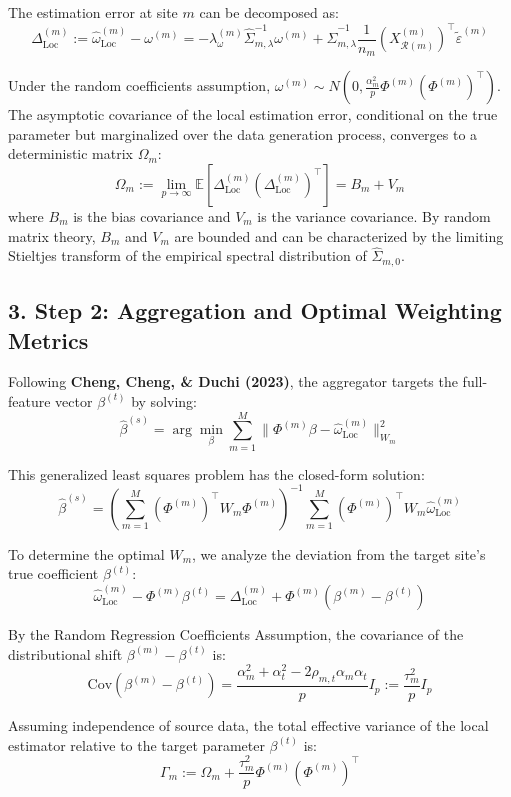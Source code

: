 \documentclass{article}
\begin{document}
The estimation error at site $m$ can be decomposed as:
\[
\Delta^{(m)}_{\mathrm{Loc}} := \widehat\omega^{(m)}_{\mathrm{Loc}} - \omega^{(m)} = - \lambda_\omega^{(m)} \hat{\Sigma}_{m,\lambda}^{-1} \omega^{(m)} + \hat{\Sigma}_{m,\lambda}^{-1} \frac{1}{n_m} (X^{(m)}_{\mathcal{R}(m)})^\top \tilde{\varepsilon}^{(m)}
\]

Under the random coefficients assumption, $\omega^{(m)} \sim N\left(0, \frac{\alpha_m^2}{p} \Phi^{(m)} (\Phi^{(m)})^\top\right)$. The asymptotic covariance of the local estimation error, conditional on the true parameter but marginalized over the data generation process, converges to a deterministic matrix $\Omega_m$:
\[
\Omega_m := \lim_{p \to \infty} \mathbb{E}\left[ \Delta^{(m)}_{\mathrm{Loc}} (\Delta^{(m)}_{\mathrm{Loc}})^\top \right] = B_m + V_m
\]
where $B_m$ is the bias covariance and $V_m$ is the variance covariance. By random matrix theory, $B_m$ and $V_m$ are bounded and can be characterized by the limiting Stieltjes transform of the empirical spectral distribution of $\hat{\Sigma}_{m,0}$.

\subsection*{3. Step 2: Aggregation and Optimal Weighting Metrics}

Following \textbf{Cheng, Cheng, \& Duchi (2023)}, the aggregator targets the full-feature vector $\beta^{(t)}$ by solving:
\[
\hat\beta^{(s)} = \arg\min_{\beta} \sum_{m=1}^M \bigl\| \Phi^{(m)}\beta - \widehat\omega^{(m)}_{\mathrm{Loc}} \bigr\|_{W_m}^2
\]

This generalized least squares problem has the closed-form solution:
\[
\hat\beta^{(s)} = \left( \sum_{m=1}^M (\Phi^{(m)})^\top W_m \Phi^{(m)} \right)^{-1} \sum_{m=1}^M (\Phi^{(m)})^\top W_m \widehat\omega^{(m)}_{\mathrm{Loc}}
\]

To determine the optimal $W_m$, we analyze the deviation from the target site's true coefficient $\beta^{(t)}$:
\[
\widehat\omega^{(m)}_{\mathrm{Loc}} - \Phi^{(m)}\beta^{(t)} = \Delta^{(m)}_{\mathrm{Loc}} + \Phi^{(m)}(\beta^{(m)} - \beta^{(t)})
\]

By the Random Regression Coefficients Assumption, the covariance of the distributional shift $\beta^{(m)} - \beta^{(t)}$ is:
\[
\mathrm{Cov}(\beta^{(m)} - \beta^{(t)}) = \frac{\alpha_m^2 + \alpha_t^2 - 2\rho_{m,t}\alpha_m\alpha_t}{p} I_p := \frac{\tau_m^2}{p} I_p
\]

Assuming independence of source data, the total effective variance of the local estimator relative to the target parameter $\beta^{(t)}$ is:
\[
\Gamma_m := \Omega_m + \frac{\tau_m^2}{p} \Phi^{(m)}(\Phi^{(m)})^\top
\]
\end{document}
